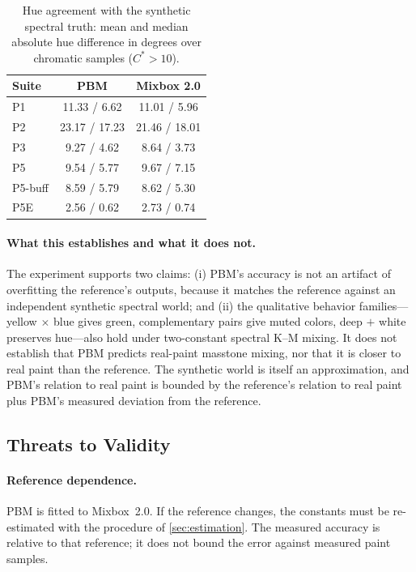 \begin{table}[t]
\centering
\small
\caption{Hue agreement with the synthetic spectral truth: mean and median absolute hue difference in degrees over chromatic samples ($C^{\ast}>10$).}
\label{tab:hue}
\begin{tabular}{lcc}
\toprule
Suite & PBM & Mixbox 2.0 \\
\midrule
P1 & 11.33 / 6.62 & 11.01 / 5.96 \\
P2 & 23.17 / 17.23 & 21.46 / 18.01 \\
P3 & 9.27 / 4.62 & 8.64 / 3.73 \\
P5 & 9.54 / 5.77 & 9.67 / 7.15 \\
P5-buff & 8.59 / 5.79 & 8.62 / 5.30 \\
P5E & 2.56 / 0.62 & 2.73 / 0.74 \\
\bottomrule
\end{tabular}
\end{table}

\paragraph{What this establishes and what it does not.}
The experiment supports two claims: (i) PBM's accuracy is not an artifact of overfitting the reference's outputs, because it matches the reference against an independent synthetic spectral world; and (ii) the qualitative behavior families---yellow $\times$ blue gives green, complementary pairs give muted colors, deep $+$ white preserves hue---also hold under two-constant spectral K--M mixing. It does not establish that PBM predicts real-paint masstone mixing, nor that it is closer to real paint than the reference. The synthetic world is itself an approximation, and PBM's relation to real paint is bounded by the reference's relation to real paint plus PBM's measured deviation from the reference.

\subsection{Threats to Validity}
\label{sec:threats}

\paragraph{Reference dependence.}
PBM is fitted to Mixbox~2.0. If the reference changes, the constants must be re-estimated with the procedure of \cref{sec:estimation}. The measured accuracy is relative to that reference; it does not bound the error against measured paint samples.

